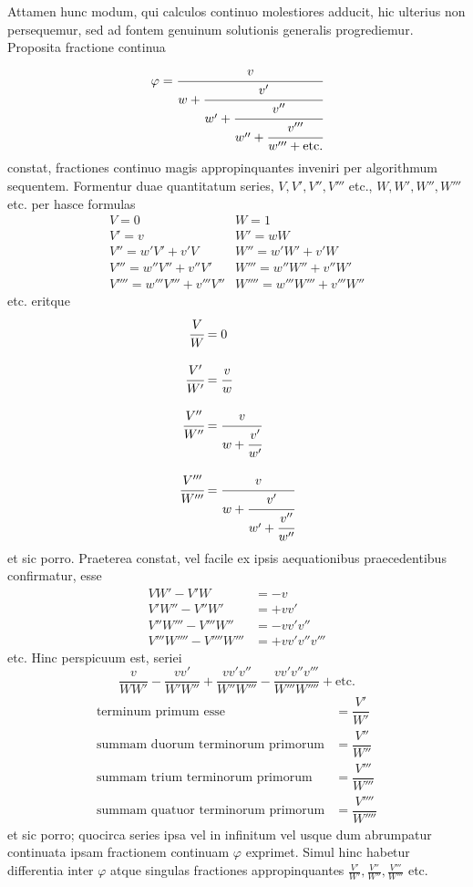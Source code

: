 Attamen hunc modum, qui calculos continuo molestiores adducit, hic ulterius non persequemur, sed ad fontem genuinum solutionis generalis progrediemur.
Proposita fractione continua
\[
\varphi=\cfrac{v}{w+\cfrac{v'}{w'+\cfrac{v''}{w''+\cfrac{v'''}{w'''+\text{etc.}}}}}
\]
constat, fractiones continuo magis appropinquantes inveniri per algorithmum
sequentem. Formentur duae quantitatum series, $V,V',V'',V'''$ etc.,
$W,W',W'',W'''$ etc. per hasce formulas
\[
\begin{array}{ll}
V=0&W=1\\[4pt]
V'=v&W'=wW\\[4pt]
V''=w'V'+v'V&W''=w'W'+v'W\\[4pt]
V'''=w''V''+v''V'&W'''=w''W''+v''W'\\[4pt]
V''''=w'''V'''+v'''V''&W''''=w'''W'''+v'''W''
\end{array}
\]
etc. eritque
\[
\begin{aligned}
\cfrac VW&=0\\[9pt]
\cfrac{V'}{W'}&=\cfrac vw\\[9pt]
\cfrac{V''}{W''}&=\cfrac v{w+\cfrac{v'}{w'}}\\[9pt]
\cfrac{V'''}{W'''}&=\cfrac v{w+\cfrac{v'}{w'+\cfrac{v''}{w''}}}
\end{aligned}
\]
et sic porro. Praeterea constat, vel facile ex ipsis aequationibus praecedentibus
confirmatur, esse
\[
\begin{aligned}
VW'-V'W&=-v\\
V'W''-V''W'&=+vv'\\
V''W'''-V'''W''&=-vv'v''\\
V'''W''''-V''''W'''&=+vv'v''v'''
\end{aligned}
\]
etc. Hinc perspicuum est, seriei
\[
\frac v{WW'}-\frac{vv'}{W'W''}+\frac{vv'v''}{W''W'''}-\frac{vv'v''v'''}{W'''W''''}+\text{etc.}
\]
\[
\begin{array}{ll}
\text{terminum primum esse}&=\dfrac{V'}{W'}\\[10pt]
\text{summam duorum terminorum primorum}&=\dfrac{V''}{W''}\\[10pt]
\text{summam trium terminorum primorum}&=\dfrac{V'''}{W'''}\\[10pt]
\text{summam quatuor terminorum primorum}&=\dfrac{V''''}{W''''}
\end{array}
\]
et sic porro; quocirca series ipsa vel in infinitum vel usque dum abrumpatur continuata ipsam fractionem continuam $\varphi$ exprimet. Simul hinc habetur differentia
inter $\varphi$ atque singulas fractiones appropinquantes $\frac{V'}{W'},\frac{V''}{W''},\frac{V'''}{W'''}$ etc.


